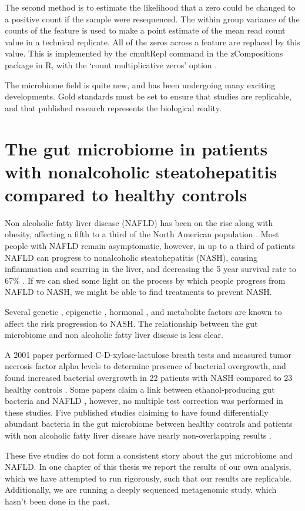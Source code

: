 The second method is to estimate the likelihood that a zero could be changed to a positive count if the sample were resequenced. The within group variance of the counts of the feature is used to make a point estimate of the mean read count value in a technical replicate. All of the zeros across a feature are replaced by this value. This is implemented by the cmultRepl command in the zCompositions package in R, with the `count multiplicative zeros' option \cite{palarea2015zcompositions}.

The microbiome field is quite new, and has been undergoing many exciting developments. Gold standards must be set to ensure that studies are replicable, and that published research represents the biological reality.

\section{The gut microbiome in patients with nonalcoholic steatohepatitis compared to healthy controls}

Non alcoholic fatty liver disease (NAFLD) has been on the rise along with obesity, affecting a fifth to a third of the North American population \cite{preiss2008non}. Most people with NAFLD remain asymptomatic, however, in up to a third of patients NAFLD can progress to nonalcoholic steatohepatitis (NASH), causing inflammation and scarring in the liver, and decreasing the 5 year survival rate to 67\% \cite{propst1995prognosis}. If we can shed some light on the process by which people progress from NAFLD to NASH, we might be able to find treatments to prevent NASH.

Several genetic \cite{sookoian2011meta} \cite{rivera2007toll}, epigenetic \cite{murphy2013relationship}, hormonal \cite{yasuda1999suppressive}, and metabolite \cite{raman2013fecal} factors are known to affect the risk progression to NASH. The relationship between the gut microbiome and non alcoholic fatty liver disease is less clear.

A 2001 paper performed C-D-xylose-lactulose breath tests and measured tumor necrosis factor alpha levels to determine presence of bacterial overgrowth, and found increased bacterial overgrowth in 22 patients with NASH compared to 23 healthy controls \cite{wigg2001role}. Some papers claim a link between ethanol-producing gut bacteria and NAFLD \cite{zhu2013characterization} \cite{jiang2015dysbiosis}, however, no multiple test correction was performed in these studies. Five published studies claiming to have found differentially abundant bacteria in the gut microbiome between healthy controls and patients with non alcoholic fatty liver disease have nearly non-overlapping results \cite{zhu2013characterization} \cite{wong2013molecular} \cite{raman2013fecal} \cite{jiang2015dysbiosis} \cite{boursier2016severity}.

These five studies do not form a consistent story about the gut microbiome and NAFLD. In one chapter of this thesis we report the results of our own analysis, which we have attempted to run rigorously, such that our results are replicable. Additionally, we are running a deeply sequenced metagenomic study, which hasn’t been done in the past.
